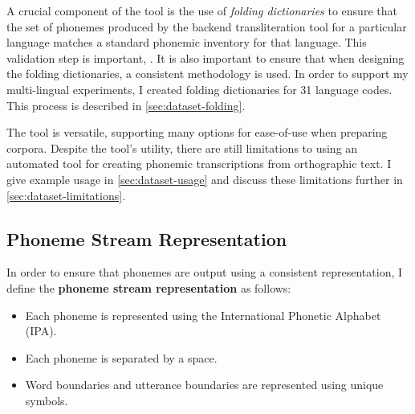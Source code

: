 A crucial component of the tool is the use of \emph{folding dictionaries} to ensure that the set of phonemes produced by the backend transliteration tool for a particular language matches a standard phonemic inventory for that language. This validation step is important, . It is also important to ensure that when designing the folding dictionaries, a consistent methodology is used. In order to support my multi-lingual experiments, I created folding dictionaries for 31 language codes. This process is described in \cref{sec:dataset-folding}.

The tool is versatile, supporting many options for ease-of-use when preparing corpora. Despite the tool's utility, there are still limitations to using an automated tool for creating phonemic transcriptions from orthographic text. I give example usage in \cref{sec:dataset-usage} and discuss these limitations further in \cref{sec:dataset-limitations}.



\subsection{Phoneme Stream Representation}
\label{sec:dataset-phoneme-stream-representation}

In order to ensure that phonemes are output using a consistent representation, I define the \textbf{phoneme stream representation} as follows:
\begin{itemize}
    \item Each phoneme is represented using the International Phonetic Alphabet (IPA).
    \item Each phoneme is separated by a space.
    \item Word boundaries and utterance boundaries are represented using unique symbols.
\end{itemize}

